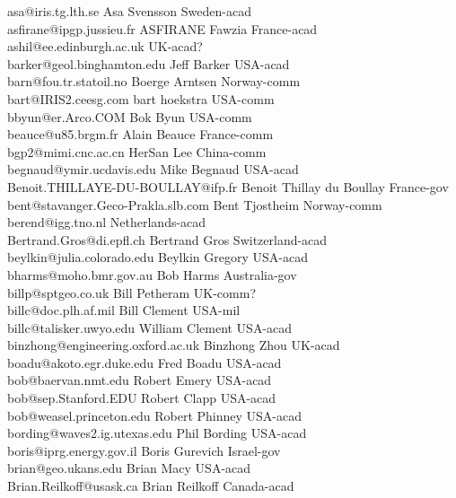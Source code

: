 \begin{tabbing}
asa@iris.tg.lth.se \> Asa Svensson \> Sweden-acad\\
asfirane@ipgp.jussieu.fr \> ASFIRANE Fawzia \> France-acad\\
ashil@ee.edinburgh.ac.uk \> \> UK-acad?\\
barker@geol.binghamton.edu \> Jeff Barker \> USA-acad\\
barn@fou.tr.statoil.no \> Boerge Arntsen \> Norway-comm\\
bart@IRIS2.ceesg.com \> bart hoekstra \> USA-comm\\
bbyun@er.Arco.COM \> Bok Byun \> USA-comm\\
beauce@u85.brgm.fr \> Alain Beauce \> France-comm\\
bgp2@mimi.cnc.ac.cn \> HerSan Lee \> China-comm\\
begnaud@ymir.ucdavis.edu \> Mike Begnaud \> USA-acad\\
Benoit.THILLAYE-DU-BOULLAY@ifp.fr \> Benoit Thillay du Boullay \> France-gov\\ 
bent@stavanger.Geco-Prakla.slb.com \> Bent Tjostheim \> Norway-comm\\
berend@igg.tno.nl  \>    \> Netherlands-acad\\
Bertrand.Gros@di.epfl.ch \> Bertrand Gros \> Switzerland-acad\\
beylkin@julia.colorado.edu \> Beylkin Gregory \> USA-acad\\
bharms@moho.bmr.gov.au \> Bob Harms \> Australia-gov\\
billp@sptgeo.co.uk \> Bill Petheram \>  UK-comm?\\
billc@doc.plh.af.mil \> Bill Clement \> USA-mil\\
billc@talisker.uwyo.edu  \> William Clement \> USA-acad\\
binzhong@engineering.oxford.ac.uk \> Binzhong Zhou \> UK-acad\\
boadu@akoto.egr.duke.edu \> Fred Boadu \> USA-acad\\
bob@baervan.nmt.edu \> Robert Emery \> USA-acad\\
bob@sep.Stanford.EDU \> Robert Clapp \> USA-acad\\
bob@weasel.princeton.edu \> Robert Phinney  \>   USA-acad\\
bording@waves2.ig.utexas.edu \> Phil Bording \> USA-acad\\
boris@iprg.energy.gov.il \> Boris Gurevich \> Israel-gov\\
brian@geo.ukans.edu \> Brian Macy \> USA-acad\\
Brian.Reilkoff@usask.ca \> Brian Reilkoff \> Canada-acad\\

\end{tabbing}
